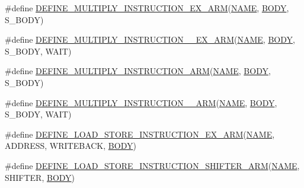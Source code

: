 \begin{DoxyCompactItemize}
\item 
\#define \mbox{\hyperlink{isa-arm_8c_ac91392eda72339bc29cd80f786531925}{D\+E\+F\+I\+N\+E\+\_\+\+M\+U\+L\+T\+I\+P\+L\+Y\+\_\+\+I\+N\+S\+T\+R\+U\+C\+T\+I\+O\+N\+\_\+\+E\+X\+\_\+\+A\+RM}}(\mbox{\hyperlink{inflate_8h_a164ea0159d5f0b5f12a646f25f99eceaa67bc2ced260a8e43805d2480a785d312}{N\+A\+ME}},  \mbox{\hyperlink{gzlog_8c_aa6bdf6a6d9916c343e1e17774d84a156}{B\+O\+DY}},  S\+\_\+\+B\+O\+DY)
\item 
\#define \mbox{\hyperlink{isa-arm_8c_a82c659ad9e9c43c6085ab387d3b0fa72}{D\+E\+F\+I\+N\+E\+\_\+\+M\+U\+L\+T\+I\+P\+L\+Y\+\_\+\+I\+N\+S\+T\+R\+U\+C\+T\+I\+O\+N\+\_\+\_\+\+E\+X\+\_\+\+A\+RM}}(\mbox{\hyperlink{inflate_8h_a164ea0159d5f0b5f12a646f25f99eceaa67bc2ced260a8e43805d2480a785d312}{N\+A\+ME}},  \mbox{\hyperlink{gzlog_8c_aa6bdf6a6d9916c343e1e17774d84a156}{B\+O\+DY}},  S\+\_\+\+B\+O\+DY,  W\+A\+IT)
\item 
\#define \mbox{\hyperlink{isa-arm_8c_ac66f9b211aee153179daa111aed4d223}{D\+E\+F\+I\+N\+E\+\_\+\+M\+U\+L\+T\+I\+P\+L\+Y\+\_\+\+I\+N\+S\+T\+R\+U\+C\+T\+I\+O\+N\+\_\+\+A\+RM}}(\mbox{\hyperlink{inflate_8h_a164ea0159d5f0b5f12a646f25f99eceaa67bc2ced260a8e43805d2480a785d312}{N\+A\+ME}},  \mbox{\hyperlink{gzlog_8c_aa6bdf6a6d9916c343e1e17774d84a156}{B\+O\+DY}},  S\+\_\+\+B\+O\+DY)
\item 
\#define \mbox{\hyperlink{isa-arm_8c_a84bf848ce5a38235e0b670ee30fc85a7}{D\+E\+F\+I\+N\+E\+\_\+\+M\+U\+L\+T\+I\+P\+L\+Y\+\_\+\+I\+N\+S\+T\+R\+U\+C\+T\+I\+O\+N\+\_\+\_\+\+A\+RM}}(\mbox{\hyperlink{inflate_8h_a164ea0159d5f0b5f12a646f25f99eceaa67bc2ced260a8e43805d2480a785d312}{N\+A\+ME}},  \mbox{\hyperlink{gzlog_8c_aa6bdf6a6d9916c343e1e17774d84a156}{B\+O\+DY}},  S\+\_\+\+B\+O\+DY,  W\+A\+IT)
\item 
\#define \mbox{\hyperlink{isa-arm_8c_af3fcd6969f12879634732491de99e437}{D\+E\+F\+I\+N\+E\+\_\+\+L\+O\+A\+D\+\_\+\+S\+T\+O\+R\+E\+\_\+\+I\+N\+S\+T\+R\+U\+C\+T\+I\+O\+N\+\_\+\+E\+X\+\_\+\+A\+RM}}(\mbox{\hyperlink{inflate_8h_a164ea0159d5f0b5f12a646f25f99eceaa67bc2ced260a8e43805d2480a785d312}{N\+A\+ME}},  A\+D\+D\+R\+E\+SS,  W\+R\+I\+T\+E\+B\+A\+CK,  \mbox{\hyperlink{gzlog_8c_aa6bdf6a6d9916c343e1e17774d84a156}{B\+O\+DY}})
\item 
\#define \mbox{\hyperlink{isa-arm_8c_a566d428e5e9b821adeab6881cad8e100}{D\+E\+F\+I\+N\+E\+\_\+\+L\+O\+A\+D\+\_\+\+S\+T\+O\+R\+E\+\_\+\+I\+N\+S\+T\+R\+U\+C\+T\+I\+O\+N\+\_\+\+S\+H\+I\+F\+T\+E\+R\+\_\+\+A\+RM}}(\mbox{\hyperlink{inflate_8h_a164ea0159d5f0b5f12a646f25f99eceaa67bc2ced260a8e43805d2480a785d312}{N\+A\+ME}},  S\+H\+I\+F\+T\+ER,  \mbox{\hyperlink{gzlog_8c_aa6bdf6a6d9916c343e1e17774d84a156}{B\+O\+DY}})

\end{DoxyCompactItemize}
